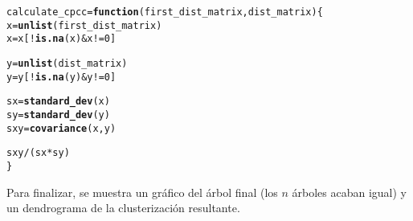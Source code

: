 \documentclass[12pt]{report}\usepackage[]{graphicx}\usepackage[dvipsnames]{xcolor}
\makeatletter
\newcommand{\hlnum}[1]{\textcolor[rgb]{0.686,0.059,0.569}{#1}}%
\newcommand{\hlopt}[1]{\textcolor[rgb]{0,0,0}{#1}}%
\newcommand{\hlstd}[1]{\textcolor[rgb]{0.345,0.345,0.345}{#1}}%
\newcommand{\hlkwa}[1]{\textcolor[rgb]{0.161,0.373,0.58}{\textbf{#1}}}%
\newcommand{\hlkwb}[1]{\textcolor[rgb]{0.69,0.353,0.396}{#1}}%
\newcommand{\hlkwc}[1]{\textcolor[rgb]{0.333,0.667,0.333}{#1}}%
\newcommand{\hlkwd}[1]{\textcolor[rgb]{0.737,0.353,0.396}{\textbf{#1}}}%
\newenvironment{kframe}{%
 \def\at@end@of@kframe{}%
 \ifinner\ifhmode%
  \def\at@end@of@kframe{\end{minipage}}%
  \begin{minipage}{\columnwidth}%
 \fi\fi%
 \def\FrameCommand##1{\hskip\@totalleftmargin \hskip-\fboxsep
 \colorbox{shadecolor}{##1}\hskip-\fboxsep
     \hskip-\linewidth \hskip-\@totalleftmargin \hskip\columnwidth}%
 \MakeFramed {\advance\hsize-\width
   \@totalleftmargin\z@ \linewidth\hsize
   \@setminipage}}%
 {\par\unskip\endMakeFramed%
 \at@end@of@kframe}
\newenvironment{knitrout}{}{} %
\makeatother
\begin{document}
\begin{knitrout}
\color{fgcolor}\begin{kframe}
\begin{alltt}
\hlstd{calculate_cpcc} \hlkwb{=} \hlkwa{function}\hlstd{(}\hlkwc{first_dist_matrix}\hlstd{,} \hlkwc{dist_matrix}\hlstd{) \{}
        \hlstd{x} \hlkwb{=} \hlkwd{unlist}\hlstd{(first_dist_matrix)}
        \hlstd{x} \hlkwb{=} \hlstd{x[}\hlopt{!}\hlkwd{is.na}\hlstd{(x)} \hlopt{&} \hlstd{x} \hlopt{!=} \hlnum{0}\hlstd{]}

        \hlstd{y} \hlkwb{=} \hlkwd{unlist}\hlstd{(dist_matrix)}
        \hlstd{y} \hlkwb{=} \hlstd{y[}\hlopt{!}\hlkwd{is.na}\hlstd{(y)} \hlopt{&} \hlstd{y} \hlopt{!=} \hlnum{0}\hlstd{]}

        \hlstd{sx} \hlkwb{=} \hlkwd{standard_dev}\hlstd{(x)}
        \hlstd{sy} \hlkwb{=} \hlkwd{standard_dev}\hlstd{(y)}
        \hlstd{sxy} \hlkwb{=} \hlkwd{covariance}\hlstd{(x, y)}

        \hlstd{sxy} \hlopt{/} \hlstd{(sx} \hlopt{*} \hlstd{sy)}
\hlstd{\}}
\end{alltt}
\end{kframe}
\end{knitrout}
		 		
		 		Para finalizar, se muestra un gráfico del árbol final (los $n$ árboles acaban igual) y un dendrograma de la clusterización resultante. 
		 		
		 		
\end{document}
